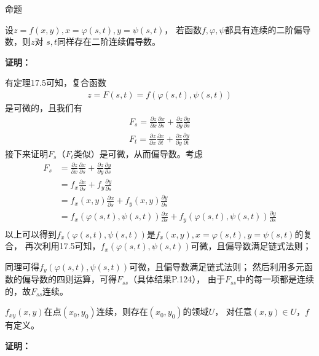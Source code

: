\documentclass{article}
\begin{document}
\begin{zremark}
  命题

  设$z = f(x, y), x = \varphi (s, t), y = \psi (s, t)$，
  若函数$f, \varphi, \psi$都具有连续的二阶偏导数，则$z$对
  $s, t$同样存在二阶连续偏导数。
\end{zremark}

\textbf{证明：}

有定理17.5可知，复合函数
\begin{align*}
  z = F(s, t) = f(\varphi (s, t), \psi (s, t))
\end{align*}
是可微的，且我们有
\begin{align*}
  F_s = \frac{\partial z}{\partial x} \frac{\partial x}{\partial s} + \frac{\partial z}{\partial y} \frac{\partial y}{\partial s} \\
  F_t = \frac{\partial z}{\partial x} \frac{\partial x}{\partial t} + \frac{\partial z}{\partial y} \frac{\partial y}{\partial t}
\end{align*}
接下来证明$F_s$（$F_t$类似）是可微，从而偏导数。考虑
\begin{align*}
  F_s
   & = \frac{\partial z}{\partial x} \frac{\partial x}{\partial s} + \frac{\partial z}{\partial y} \frac{\partial y}{\partial s}       \\
   & = f_x \frac{\partial x}{\partial s} + f_y \frac{\partial y}{\partial s}                                                           \\
   & = f_x(x, y) \frac{\partial x}{\partial s} + f_y(x, y) \frac{\partial y}{\partial s}                                               \\
   & = f_x(\varphi (s, t), \psi (s, t)) \frac{\partial x}{\partial s} + f_y(\varphi (s, t), \psi (s, t)) \frac{\partial y}{\partial s} \\
\end{align*}
以上可以得到$f_x(\varphi (s, t), \psi (s, t))$是$f_x(x, y), x = \varphi (s, t), y = \psi (s, t)$的复合，
再次利用17.5可知，$f_x(\varphi (s, t), \psi (s, t))$可微，且偏导数满足链式法则；

同理可得$f_y(\varphi (s, t), \psi (s, t))$可微，且偏导数满足链式法则；
然后利用多元函数的偏导数的四则运算，可得$F_{ss}$（具体结果P.124），
由于$F_{ss}$中的每一项都是连续的，故$F_{ss}$连续。

\begin{zremark}
  $f_{xy}(x, y)$在点$(x_0, y_0)$连续，则存在$(x_0, y_0)$的领域$U$，
  对任意$(x, y) \in U$，$f$有定义。
\end{zremark}
\textbf{证明：}
\end{document}
